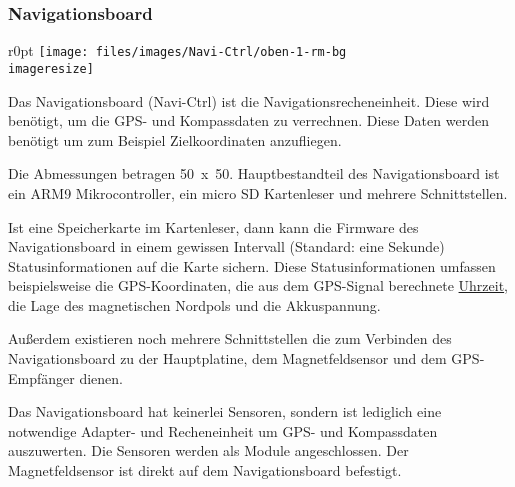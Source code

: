 \subsubsection{Navigationsboard}
\begin{wrapfigure}{r}{0pt}
	\texttt{[image: files/images/Navi-Ctrl/oben-1-rm-bg\\imageresize]}
\end{wrapfigure}

Das Navigationsboard (Navi-Ctrl) ist die Navigationsrecheneinheit.
Diese wird benötigt, um die \ac{GPS}- und Kompassdaten zu verrechnen.
Diese Daten werden benötigt um zum Beispiel
Zielkoordinaten anzufliegen.

Die Abmessungen betragen \unit{50 x 50}{\milli\metre}.
Hauptbestandteil des Navigationsboard ist ein ARM9 Mikrocontroller,
ein micro \ac{SD} Kartenleser und mehrere Schnittstellen.

Ist eine Speicherkarte im Kartenleser, dann kann die Firmware des
Navigationsboard in einem gewissen Intervall (Standard: eine Sekunde)
Statusinformationen auf die Karte sichern.
Diese Statusinformationen umfassen beispielsweise die \ac{GPS}-Koordinaten,
die aus dem \ac{GPS}-Signal berechnete
\href{http://de.wikipedia.org/wiki/GPS-Zeit}{Uhrzeit},
die Lage des magnetischen Nordpols und die Akkuspannung.

Außerdem existieren noch mehrere Schnittstellen die zum Verbinden
des Navigationsboard zu der Hauptplatine, dem Magnetfeldsensor
und dem \acs{GPS}-Empfänger dienen.

Das Navigationsboard hat keinerlei Sensoren,
sondern ist lediglich eine notwendige Adapter- und Recheneinheit
um \acs{GPS}- und Kompassdaten auszuwerten.
Die Sensoren werden als Module angeschlossen.
Der Magnetfeldsensor ist direkt auf dem Navigationsboard befestigt.
